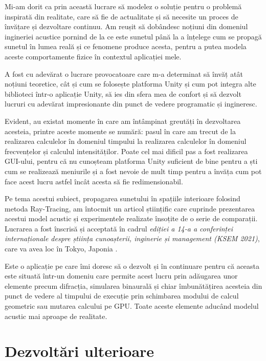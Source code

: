 	Mi-am dorit ca prin această lucrare să modelez o soluție pentru o problemă inspirată din realitate, care să fie de actualitate și să necesite un proces de învățare și dezvoltare continuu. Am reușit să dobândesc noțiuni din domeniul ingineriei acustice pornind de la ce este sunetul până la a înțelege cum se propagă sunetul în lumea reală și ce fenomene produce acesta, pentru a putea modela aceste comportamente fizice în contextul aplicației mele.
	
	A fost cu adevărat o lucrare provocatoare care m-a determinat să învăț atât noțiuni teoretice, cât și cum se folosește platforma Unity și cum pot integra alte biblioteci într-o aplicație Unity, să ies din sfera mea de confort și să dezvolt lucruri cu adevărat impresionante din punct de vedere programatic și ingineresc. 
	
	Evident, au existat momente în care am întâmpinat greutăți în dezvoltarea acesteia, printre aceste momente se numără: pasul în care am trecut de la realizarea calculelor în domeniul timpului la realizarea calculelor în domeniul frecvențelor și calculul intensităților. Poate cel mai dificil pas a fost realizarea GUI-ului, pentru că nu cunoșteam platforma Unity suficient de bine pentru a ști cum se realizează meniurile și a fost nevoie de mult timp pentru a învăța cum pot face acest lucru astfel încât acesta să fie redimensionabil.
	
	Pe tema acestui subiect, propagarea sunetului în spațiile interioare folosind metoda Ray-Tracing, am întocmit un articol științific care cuprinde prezentarea acestui model acustic și experimentele realizate însoțite de o serie de comparații. Lucrarea a fost înscrisă și acceptată în cadrul \textit{ediției a 14-a a conferinței internaționale despre știința cunoașterii, inginerie și management (KSEM 2021)}, care va avea loc în Tokyo, Japonia \cite{conf}.
		
	Este o aplicație pe care îmi doresc să o dezvolt și în continuare pentru că aceasta este situată într-un domeniu care permite acest lucru prin adăugarea unor elemente precum difracția, simularea binaurală și chiar îmbunătățirea acesteia din punct de vedere al timpului de execuție prin schimbarea modului de calcul geometric sau mutarea calcului pe GPU. Toate aceste elemente aducând modelul acustic mai aproape de realitate.

	
\section{Dezvolt\u{a}ri ulterioare}

